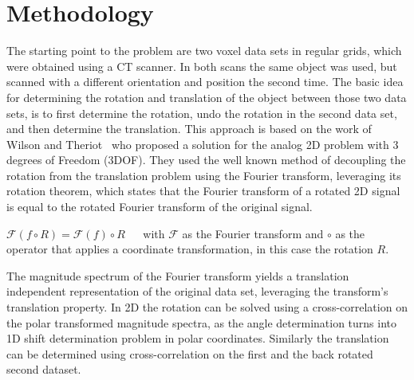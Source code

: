 \section{Methodology}
The starting point to the problem are two voxel data sets in regular grids, which were obtained using a CT scanner.
In both scans the same object was used, but scanned with a different orientation and position the second time.
The basic idea for determining the rotation and translation of the object between those two data sets, is to first determine the rotation, undo the rotation in the second data set, and then determine the translation.
This approach is based on the work of Wilson and Theriot~\cite{WilsonT06} who proposed a solution for the analog 2D problem with 3 degrees of Freedom (3DOF).
They used the well known method of decoupling the rotation from the translation problem using the Fourier transform, leveraging its 
rotation theorem, which states that the Fourier transform of a rotated 2D signal is equal to the rotated Fourier transform of the original signal.

$\mathcal{F}(f \circ R) = \mathcal{F}(f) \circ R \;\quad$
with $\mathcal{F}$ as the Fourier transform and $\circ$ as the operator that applies a coordinate transformation, in this case the rotation $R$.

The magnitude spectrum of the Fourier transform yields a translation independent representation of the original data set, leveraging the transform's translation property.
In 2D the rotation can be solved using a cross-correlation on the polar transformed magnitude spectra, as the angle determination turns into 1D shift determination problem in polar coordinates.
Similarly the translation can be determined using cross-correlation on the first and the back rotated second dataset.

